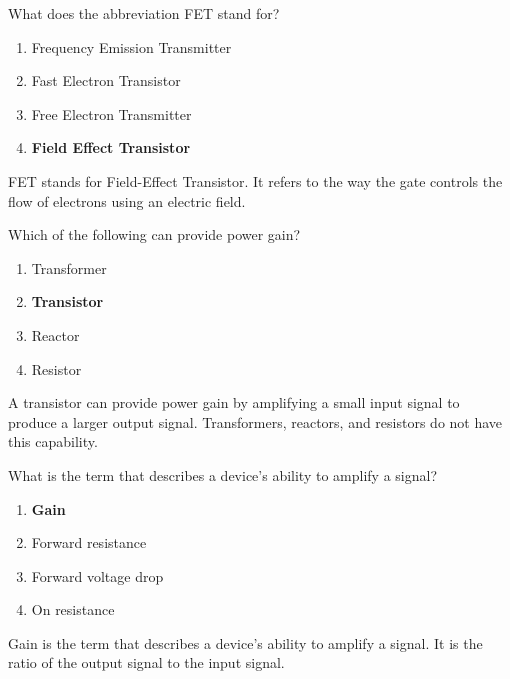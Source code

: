 \begin{tcolorbox}[colback=gray!10!white,colframe=black!75!black,title={T6B08}]
    What does the abbreviation FET stand for?
    \begin{enumerate}[label=\Alph*),noitemsep]
        \item Frequency Emission Transmitter
        \item Fast Electron Transistor
        \item Free Electron Transmitter
        \item \textbf{Field Effect Transistor}
    \end{enumerate}
\end{tcolorbox}
FET stands for Field-Effect Transistor. It refers to the way the gate controls the flow of electrons using an electric field.

\begin{tcolorbox}[colback=gray!10!white,colframe=black!75!black,title={T6B10}]
    Which of the following can provide power gain?
    \begin{enumerate}[label=\Alph*),noitemsep]
        \item Transformer
        \item \textbf{Transistor}
        \item Reactor
        \item Resistor
    \end{enumerate}
\end{tcolorbox}
A transistor can provide power gain by amplifying a small input signal to produce a larger output signal. Transformers, reactors, and resistors do not have this capability.

\begin{tcolorbox}[colback=gray!10!white,colframe=black!75!black,title={T6B11}]
    What is the term that describes a device's ability to amplify a signal?
    \begin{enumerate}[label=\Alph*),noitemsep]
        \item \textbf{Gain}
        \item Forward resistance
        \item Forward voltage drop
        \item On resistance
    \end{enumerate}
\end{tcolorbox}
Gain is the term that describes a device's ability to amplify a signal. It is the ratio of the output signal to the input signal.

